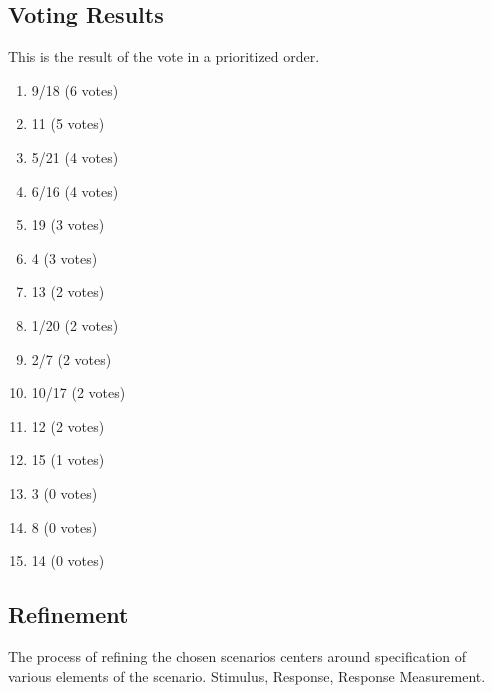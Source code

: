 \documentclass[a4paper,10pt]{article}
\begin{document}
\subsection{Voting Results}
This is the result of the vote in a prioritized order.
\begin{enumerate}
\item 9/18 (6 votes)
\item 11 (5 votes)
\item 5/21 (4 votes)
\item 6/16 (4 votes)
\item 19 (3 votes)
\item 4 (3 votes)
\item 13 (2 votes)
\item 1/20 (2 votes)
\item 2/7 (2 votes)
\item 10/17 (2 votes)
\item 12 (2 votes)
\item 15 (1 votes)
\item 3 (0 votes)
\item 8 (0 votes)
\item 14 (0 votes)
\end{enumerate}
\subsection{Refinement}
The process of refining the chosen scenarios centers around specification of various elements of the scenario. Stimulus, Response, Response Measurement. 
\end{document}
